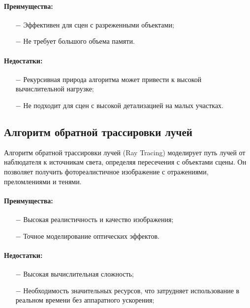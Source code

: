 \paragraph{Преимущества:}
\begin{itemize}
	\item[$-$] Эффективен для сцен с разреженными объектами;
    \item[$-$] Не требует большого объема памяти.
\end{itemize}
\paragraph{Недостатки:}
\begin{itemize}
	\item[$-$] Рекурсивная природа алгоритма может привести к высокой вычислительной нагрузке;
    \item[$-$] Не подходит для сцен с высокой детализацией на малых участках.
\end{itemize}

\subsection{Алгоритм обратной трассировки лучей}

Алгоритм обратной трассировки лучей (Ray Tracing) моделирует путь лучей от наблюдателя к источникам света, определяя пересечения с объектами сцены. Он позволяет получить фотореалистичное изображение с отражениями, преломлениями и тенями.

\paragraph{Преимущества:}
\begin{itemize}
	\item[$-$] Высокая реалистичность и качество изображения;
    \item[$-$] Точное моделирование оптических эффектов.
\end{itemize}
\paragraph{Недостатки:}
\begin{itemize}
	\item[$-$] Высокая вычислительная сложность;
    \item[$-$] Необходимость значительных ресурсов, что затрудняет использование в реальном времени без аппаратного ускорения;
\end{itemize}

